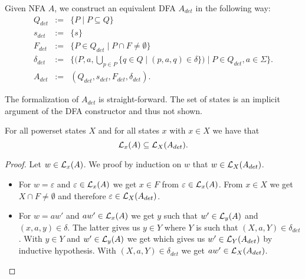 \begin{definition}
Given NFA $A$, we construct an equivalent DFA $A_{det}$ in the following way:
\begin{eqnarray*}
    Q_{det} & := & \{P \; | \; P \subseteq Q\} \\
    {s}_{det} & := & \{ s \} \\
    F_{det} & := & \{ P \in Q_{det} \; | \; P \cap F \neq \emptyset \} \\
    \delta_{det} & := & \{ (P,a,\bigcup \limits _{p \in P} \{ q \in Q \; | \; (p,a,q) \in \delta \}) \; | \; P \in Q_{det}, a \in \Sigma \}.     \\
    A_{det} &:=&  (Q_{det}, s_{det}, F_{det}, \delta_{det}).
\end{eqnarray*}
\end{definition}

The formalization of $A_{det}$ is straight-forward. 
The set of states is an implicit argument of the DFA constructor and thus not shown.


\begin{lemma}
    \label{nfa_to_dfa_aux2}
    For all powerset states $X$ and for all states $x$ with $x \in X$ we have that
    \begin{equation*}
        \mathcal{L}_{x}(A) \subseteq \mathcal{L}_{X}(A_{det}).
    \end{equation*}
\end{lemma}

\begin{proof}
    Let $w \in \mathcal{L}_{x}(A)$. We proof by induction on $w$ that $w \in \mathcal{L}_{X}(A_{det})$. 
    \begin{itemize}
        \item
            For $w = \varepsilon$ and $\varepsilon \in \mathcal{L}_{x}(A)$ we get $x \in F$ from $\varepsilon \in \mathcal{L}_{x}(A)$. 
            From $x \in X$ we get $X \cap F \neq \emptyset$ and therefore $\varepsilon \in \mathcal{L}_{X}(A_{det})$.
        \item
            For $w = a w'$ and $a w' \in \mathcal{L}_{x}(A)$ we get $y$ such that $w' \in \mathcal{L}_{y}(A)$ and $(x,a,y) \in \delta$.
            The latter gives us $y \in Y$ where $Y$ is such that $(X, a, Y) \in \delta_{det}$.
            With $y \in Y$ and $w' \in \mathcal{L}_{y}(A)$ we get 
            which gives us $w' \in \mathcal{L}_{Y}(A_{det})$ by inductive hypothesis.
            With $(X, a, Y) \in \delta_{det}$ we get $a w' \in \mathcal{L}_{X}(A_{det})$.
    \end{itemize}
\end{proof}


